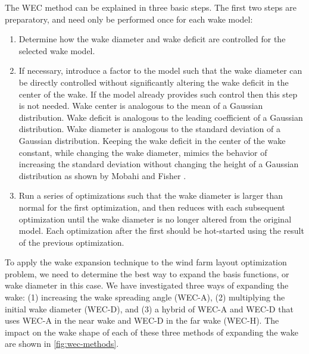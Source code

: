 \documentclass[hidelinks,sort&compress,AMA,STIX1COL]{WileyNJD-v2}
\begin{document}
The WEC method can be explained in three basic steps. The first two steps are preparatory, and need only be performed once for each wake model:
\begin{enumerate}[label=\arabic*)]
	\item Determine how the wake diameter and wake deficit are controlled for the selected wake model.
    \item If necessary, introduce a factor to the model such that the wake diameter can be directly controlled without significantly altering the wake deficit in the center of the wake. If the model already provides such control then this step is not needed. Wake center is analogous to the mean of a Gaussian distribution. Wake deficit is analogous to the leading coefficient of a Gaussian distribution. Wake diameter is analogous to the standard deviation of a Gaussian distribution.  Keeping the wake deficit in the center of the wake constant, while changing the wake diameter, mimics the behavior of increasing the standard deviation without changing the height of a Gaussian distribution as shown by Mobahi and Fisher \cite{mobahi2015}. 
    \item Run a series of optimizations such that the wake diameter is larger than normal for the first optimization, and then reduces with each subsequent optimization until the wake diameter is no longer altered from the original model. Each optimization after the first should be hot-started using the result of the previous optimization.

\end{enumerate}

To apply the wake expansion technique to the wind farm layout optimization problem, we need to determine the best way to expand the basis functions, or wake diameter in this case. We have investigated three ways of expanding the wake: (1) increasing the wake spreading angle (WEC-A), (2) multiplying the initial wake diameter (WEC-D), and (3) a hybrid of WEC-A and WEC-D that uses WEC-A in the near wake and WEC-D in the far wake (WEC-H). The impact on the wake shape of each of these three methods of expanding the wake are shown in \cref{fig:wec-methods}.
\end{document}
